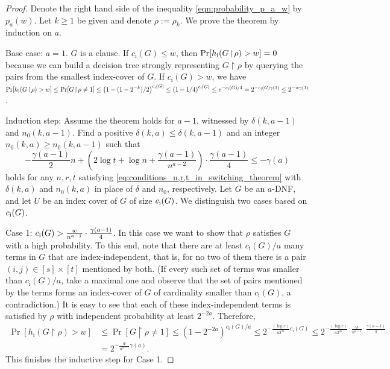 \documentclass[10pt,a4paper]{article}
\theoremstyle{remark}
\newtheorem*{switching lemma}{Switching Lemma}
\newtheorem*{open problem}{Open Problem}
\theoremstyle{definition}
\begin{document}
\begin{proof}
Denote the right hand side of the inequality \eqref{eqn:probability_p_a_w} by $p_a(w)$. Let $k \geq 1$ be given and denote $\rho := \rho_k$. We prove the theorem by induction on $a$.

Base case: $a = 1$. $G$ is a clause. If $c_{\text{i}}(G) \leq w$, then $\Pr[h_{\textnormal{i}}(G \! \restriction \! \rho) > w] = 0$ because we can build a decision tree strongly representing $G \! \restriction \! \rho$ by querying the pairs from the smallest index-cover of $G$. If $c_{\text{i}}(G) > w$, we have $\Pr[h_{\textnormal{i}}(G \! \restriction \! \rho) > w] \leq \Pr[G \! \restriction \! \rho \neq 1] \leq \left( 1 - (1-2^{-k})/2 \right)^{c_{\text{i}}(G)} \leq \left( 1 - 1/4 \right)^{c_{\text{i}}(G)}  \leq e^{- c_{\text{i}}(G)/4} = 2^{- c_{\text{i}}(G) \gamma(1)} \leq 2^{-w \gamma(1)}$.

Induction step: Assume the theorem holds for $a-1$, witnessed by $\delta(k,a-1)$ and $n_0(k,a-1)$. Find a positive $\delta(k,a) \leq \delta(k,a-1)$ and an integer $n_0(k,a) \geq n_0(k,a-1)$ such that
\begin{equation}
\label{eq:condition_on_delta_and_n0}
 - \frac{\gamma(a-1)}{2}n + \left(2 \log t + \log n + \frac{\gamma(a-1)}{n^{a-2}} \right) \cdot \frac{\gamma(a-1)}{4} \leq - \gamma(a)
\end{equation}
holds for any $n,r,t$ satisfying \ref{eq:conditions_n,r,t_in_switching_theorem} with $\delta(k,a)$ and $n_0(k,a)$ in place of $\delta$ and $n_0$, respectively. Let $G$ be an $a$-DNF, and let $U$ be an index cover of $G$ of size $c_{\textnormal{i}}(G)$. We distinguish two cases based on $c_{\textnormal{i}}(G)$.

Case 1: $c_{\textnormal{i}}(G) > \frac{w}{n^{a-1}} \cdot \frac{\gamma(a-1)}{4}$. In this case we want to show that $\rho$ satisfies $G$ with a high probability. To this end, note that there are at least $c_{\text{i}}(G)/a$ many terms in $G$ that are index-independent, that is, for no two of them there is a pair $(i,j) \in [s] \times [t]$ mentioned by both. (If every such set of terms was smaller than $c_{\text{i}}(G)/a$, take a maximal one and observe that the set of pairs mentioned by the terms forms an index-cover of $G$ of cardinality smaller than $c_{\text{i}}(G)$, a contradiction.) It is easy to see that each of these index-independent terms is satisfied by $\rho$ with independent probability at least $2^{-2a}$. Therefore,
\begin{align*}
  \Pr[h_{\text{i}}(G \! \restriction \! \rho) > w] 
& \leq \Pr[G \! \restriction \! \rho \neq 1] \leq \left( 1 - 2^{-2a} \right)^{c_{\text{i}}(G)/a} 
  \leq 2^{-\frac{(\log e)}{a 2^{2a}} c_{\text{i}}(G)} 
  \leq 2^{-\frac{(\log e)}{a 2^{2a}} \cdot \frac{w}{n^{a-1}} \cdot \frac{\gamma(a-1)}{4}} \\
& = 2^{ - \frac{w}{n^{a-1}}\gamma(a)}.
\end{align*}
This finishes the inductive step for Case 1. 


\end{proof}
\end{document}
